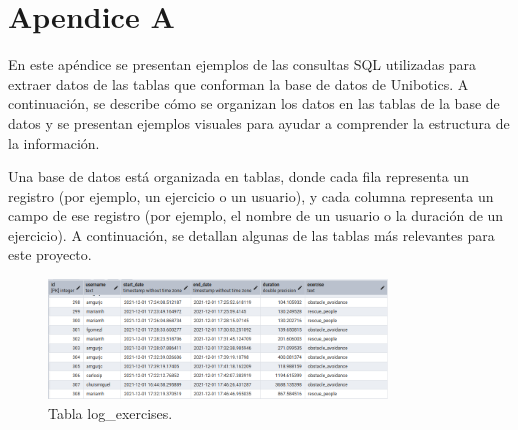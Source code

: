 \documentclass[a4paper, 12pt]{book}
\begin{document}




\cleardoublepage

%
% 

\raggedright\printbibliography[heading=bibintoc,title={Referencias}]

\chapter{Apendice A}
\label{chap:apendiceA}


En este apéndice se presentan ejemplos de las consultas SQL utilizadas para extraer datos de las tablas que conforman la base de datos de Unibotics. A continuación, se describe cómo se organizan los datos en las tablas de la base de datos y se presentan ejemplos visuales para ayudar a comprender la estructura de la información.

Una base de datos está organizada en tablas, donde cada fila representa un registro (por ejemplo, un ejercicio o un usuario), y cada columna representa un campo de ese registro (por ejemplo, el nombre de un usuario o la duración de un ejercicio). A continuación, se detallan algunas de las tablas más relevantes para este proyecto.

\begin{figure}
  \centering
  \includegraphics[width=9cm, keepaspectratio]{img/tablalogejercicios.png}
  \caption{Tabla log\_exercises.}\label{fig:tablalogejercicios}
\end{figure}
\end{document}
